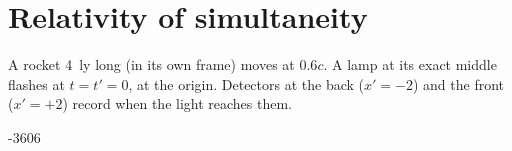 \documentclass{handout}
\begin{document}
\newpage
\section{Relativity of simultaneity}

A rocket 4~ly long (in its own frame) moves at $0.6c$. A lamp at its exact
middle flashes at $t = t' = 0$, at the origin. Detectors at the back
($x' = -2$) and the front ($x'=+2$) record when the light reaches them.

\begin{center}
\begin{spacetime}[1.0]{-3}{6}{0}{6}
\end{spacetime}
\end{center}
\end{document}
